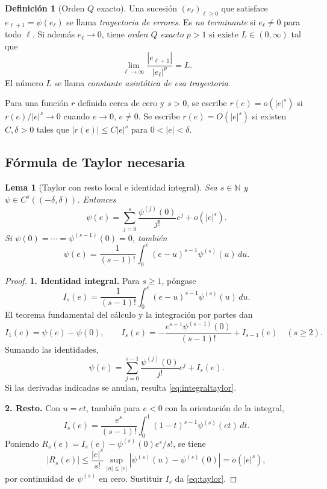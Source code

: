 \documentclass[11pt,a4paper]{article}
\numberwithin{equation}{section}
\newtheorem{lemma}[theorem]{Lema}
\theoremstyle{definition}
\newtheorem{definition}[theorem]{Definición}
\theoremstyle{remark}
\newcommand{\N}{\mathbb N}
\newcommand{\paso}[1]{\par\smallskip\noindent\textbf{#1}\quad}
\begin{document}
\begin{definition}[Orden $Q$ exacto]\label{def:Qorder}
Una sucesión $(e_\ell)_{\ell\ge0}$ que satisface $e_{\ell+1}=\psi(e_\ell)$ se llama \emph{trayectoria de errores}. Es \emph{no terminante} si $e_\ell\ne0$ para todo $\ell$. Si además $e_\ell\to0$, tiene \emph{orden $Q$ exacto $p>1$} si existe $L\in(0,\infty)$ tal que
\[
\lim_{\ell\to\infty}\frac{|e_{\ell+1}|}{|e_\ell|^p}=L.
\]
El número $L$ se llama \emph{constante asintótica de esa trayectoria}.
\end{definition}

Para una función $r$ definida cerca de cero y $s>0$, se escribe $r(e)=o(|e|^s)$ si $r(e)/|e|^s\to0$ cuando $e\to0$, $e\ne0$. Se escribe $r(e)=O(|e|^s)$ si existen $C,\delta>0$ tales que $|r(e)|\le C|e|^s$ para $0<|e|<\delta$.

\subsection{Fórmula de Taylor necesaria}
\begin{lemma}[Taylor con resto local e identidad integral]\label{lem:taylor}
Sea $s\in\N$ y $\psi\in C^s((-\delta,\delta))$. Entonces
\begin{equation}\label{eq:taylor}
\psi(e)=\sum_{j=0}^s\frac{\psi^{(j)}(0)}{j!}e^j+o(|e|^s).
\end{equation}
Si $\psi(0)=\cdots=\psi^{(s-1)}(0)=0$, también
\begin{equation}\label{eq:integraltaylor}
\psi(e)=\frac1{(s-1)!}\int_0^e(e-u)^{s-1}\psi^{(s)}(u)\,du.
\end{equation}
\end{lemma}
\begin{proof}
\paso{1. Identidad integral.}
Para $s\ge1$, póngase
\[
I_s(e)=\frac1{(s-1)!}\int_0^e(e-u)^{s-1}\psi^{(s)}(u)\,du.
\]
El teorema fundamental del cálculo y la integración por partes dan
\[
I_1(e)=\psi(e)-\psi(0),\qquad
I_s(e)=-\frac{e^{s-1}\psi^{(s-1)}(0)}{(s-1)!}+I_{s-1}(e)\quad(s\ge2).
\]
Sumando las identidades,
\[
\psi(e)=\sum_{j=0}^{s-1}\frac{\psi^{(j)}(0)}{j!}e^j+I_s(e).
\]
Si las derivadas indicadas se anulan, resulta \eqref{eq:integraltaylor}.
\paso{2. Resto.}
Con $u=et$, también para $e<0$ con la orientación de la integral,
\[
I_s(e)=\frac{e^s}{(s-1)!}\int_0^1(1-t)^{s-1}\psi^{(s)}(et)\,dt.
\]
Poniendo $R_s(e)=I_s(e)-\psi^{(s)}(0)e^s/s!$, se tiene
\[
|R_s(e)|\le\frac{|e|^s}{s!}
\sup_{|u|\le|e|}|\psi^{(s)}(u)-\psi^{(s)}(0)|=o(|e|^s),
\]
por continuidad de $\psi^{(s)}$ en cero. Sustituir $I_s$ da \eqref{eq:taylor}.
\end{proof}
\end{document}
